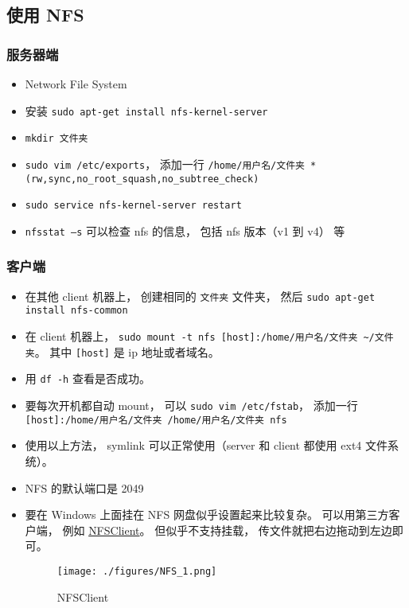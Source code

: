 \subsection{使用 NFS}
\subsubsection{服务器端}
\begin{itemize}
\item Network File System
\item 安装 \verb|sudo apt-get install nfs-kernel-server|
\item \verb|mkdir 文件夹|
\item \verb|sudo vim /etc/exports|， 添加一行 \verb|/home/用户名/文件夹 *(rw,sync,no_root_squash,no_subtree_check)|
\item \verb|sudo service nfs-kernel-server restart|
\item \verb|nfsstat –s| 可以检查 nfs 的信息， 包括 nfs 版本（v1 到 v4） 等
\end{itemize}

\subsubsection{客户端}
\begin{itemize}
\item 在其他 client 机器上， 创建相同的 \verb|文件夹| 文件夹， 然后 \verb|sudo apt-get install nfs-common|
\item 在 client 机器上， \verb|sudo mount -t nfs [host]:/home/用户名/文件夹 ~/文件夹|。 其中 \verb|[host]| 是 ip 地址或者域名。
\item 用 \verb|df -h| 查看是否成功。
\item 要每次开机都自动 mount， 可以 \verb|sudo vim /etc/fstab|， 添加一行 \verb|[host]:/home/用户名/文件夹 /home/用户名/文件夹 nfs|
\item 使用以上方法， symlink 可以正常使用（server 和 client 都使用 ext4 文件系统）。
\item NFS 的默认端口是 2049
\item 要在 Windows 上面挂在 NFS 网盘似乎设置起来比较复杂。 可以用第三方客户端， 例如 \href{https://sourceforge.net/projects/nfsclient/}{NFSClient}。 但似乎不支持挂载， 传文件就把右边拖动到左边即可。
\begin{figure}[ht]
\centering
\texttt{[image: ./figures/NFS\_1.png]}
\caption{NFSClient} \label{NFS_fig1}
\end{figure}
\end{itemize}

